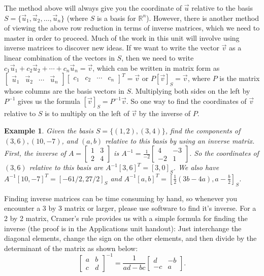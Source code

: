 \documentclass[10pt]{article}
\theoremstyle{plain}
\theoremstyle{box}
\newtheorem{example}{Example}
\newcommand{\ds}{\displaystyle}
\begin{document}
The method above will always give you the coordinate of $\vec u$ relative to the basis $S=\{\vec u_1,\vec u_2,\ldots,\vec u_n\}$ (where $S$ is a basis for ${\mathbb{R}}^n$). However, there is another method of viewing the above row reduction in terms of inverse matrices, which we need to master in order to proceed.  Much of the work in this unit will involve using inverse matrices to discover new ideas. If we want to write the vector $\vec v$ as a linear combination of the vectors in $S$, then we need to write $c_1\vec u_1+c_2\vec u_2+\cdots+c_n\vec u_n = \vec v$, which can be written in matrix form as $\begin{bmatrix}\vec u_1 & \vec u_2&\cdots&\vec u_n\end{bmatrix} \begin{bmatrix}c_1&c_2&\cdots&c_n\end{bmatrix}^T=\vec v$ or $P[\vec v]_S = \vec v$, where $P$ is the matrix whose columns are the basis vectors in $S$. Multiplying both sides on the left by $P^{-1}$ gives us the formula $[\vec v]_S=P^{-1}\vec v$. So one way to find the coordinates of $\vec v$ relative to $S$ is to multiply on the left of $\vec v$ by the inverse of $P$.  

\begin{example} 
Given the basis $S=\{(1,2),(3,4)\}$, find the components of $(3,6),(10,-7)$, and $(a,b)$ relative to this basis by using an inverse matrix.  First, the inverse of 
$A=
\begin{bmatrix}
 1 & 3 \\
 2 & 4
\end{bmatrix}
$ 
is 
$A^{-1}=
\ds\frac{1}{-2}\begin{bmatrix}
 4 & -3 \\
 -2 & 1
\end{bmatrix}
$.  So the coordinates of $(3,6)$ relative to this basis are $A^{-1}[3,6]^T = [3,0]_S$. We also have $A^{-1}[10,-7]^T=[-61/2,27/2]_S$ and $A^{-1}[a,b]^T=[\frac{1}{2} (3 b-4 a) , a-\frac{b}{2}]_S$.



\end{example}
     
Finding inverse matrices can be time consuming by hand, so whenever you encounter a 3 by 3 matrix or larger, please use software to find it's inverse.  For a 2 by 2 matrix, Cramer's rule provides us with a simple formula for finding the inverse (the proof is in the Applications unit handout): Just interchange the diagonal elements, change the sign on the other elements, and then divide by the determinant of the matrix as shown below:
$$
\begin{bmatrix}
a&b \\ c&d
\end{bmatrix}^{-1} 
= \frac{1}{ad-bc}
\begin{bmatrix}
d&-b \\ -c&a
\end{bmatrix}.
$$
\end{document}
